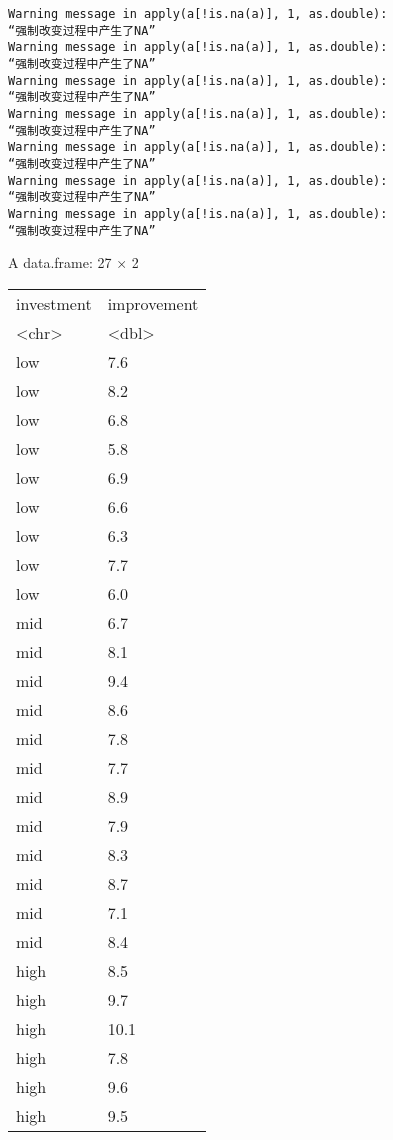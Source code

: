 \documentclass[11pt]{article}
\begin{document}
    \begin{Verbatim}[commandchars=\\\{\}]
Warning message in apply(a[!is.na(a)], 1, as.double):
“强制改变过程中产生了NA”
Warning message in apply(a[!is.na(a)], 1, as.double):
“强制改变过程中产生了NA”
Warning message in apply(a[!is.na(a)], 1, as.double):
“强制改变过程中产生了NA”
Warning message in apply(a[!is.na(a)], 1, as.double):
“强制改变过程中产生了NA”
Warning message in apply(a[!is.na(a)], 1, as.double):
“强制改变过程中产生了NA”
Warning message in apply(a[!is.na(a)], 1, as.double):
“强制改变过程中产生了NA”
Warning message in apply(a[!is.na(a)], 1, as.double):
“强制改变过程中产生了NA”
    \end{Verbatim}

    A data.frame: 27 × 2
\begin{tabular}{ll}
 investment & improvement\\
 <chr> & <dbl>\\
\hline
	 low  &  7.6\\
	 low  &  8.2\\
	 low  &  6.8\\
	 low  &  5.8\\
	 low  &  6.9\\
	 low  &  6.6\\
	 low  &  6.3\\
	 low  &  7.7\\
	 low  &  6.0\\
	 mid  &  6.7\\
	 mid  &  8.1\\
	 mid  &  9.4\\
	 mid  &  8.6\\
	 mid  &  7.8\\
	 mid  &  7.7\\
	 mid  &  8.9\\
	 mid  &  7.9\\
	 mid  &  8.3\\
	 mid  &  8.7\\
	 mid  &  7.1\\
	 mid  &  8.4\\
	 high &  8.5\\
	 high &  9.7\\
	 high & 10.1\\
	 high &  7.8\\
	 high &  9.6\\
	 high &  9.5\\
\end{tabular}
\end{document}
